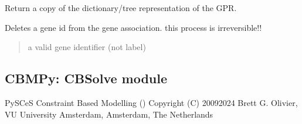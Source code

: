 \documentclass[letterpaper,12pt,english]{sphinxmanual}
\begin{document}
\begin{fulllineitems}
\begin{fulllineitems}
\end{fulllineitems}


\begin{fulllineitems}
\label{\detokenize{api/core:cbmpy.CBModel.GeneProteinAssociation.getTreeCopy}}
\pysigstartsignatures
\pysiglinewithargsret
{}
{}
{}
\pysigstopsignatures
\sphinxAtStartPar
Return a copy of the dictionary/tree representation of the GPR.

\end{fulllineitems}


\begin{fulllineitems}
\label{\detokenize{api/core:cbmpy.CBModel.GeneProteinAssociation.deleteGeneFromAssociation}}
\pysigstartsignatures
\pysiglinewithargsret
{}
{}
{}
\pysigstopsignatures
\sphinxAtStartPar
Deletes a gene id from the gene association.  this process is irreversible!!
\begin{quote}\begin{description}
\sphinxAtStartPar
{} \textendash{} a valid gene identifier (not label)

\end{description}\end{quote}

\end{fulllineitems}


\end{fulllineitems}


\subsection{CBMPy: CBSolve module}
\label{\detokenize{api/core:cbmpy-cbsolve-module}}\label{\detokenize{api/core:module-cbmpy.CBSolve}}
\sphinxAtStartPar
PySCeS Constraint Based Modelling ()
Copyright (C) 2009\sphinxhyphen{}2024 Brett G. Olivier, VU University Amsterdam, Amsterdam, The Netherlands
\end{document}
